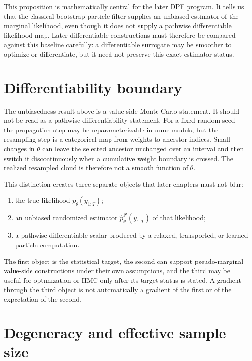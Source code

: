 This proposition is mathematically central for the later DPF program.  It tells
us that the classical bootstrap particle filter supplies an unbiased estimator
of the marginal likelihood, even though it does not supply a pathwise differentiable
likelihood map.  Later differentiable constructions must therefore be compared
against this baseline carefully: a differentiable surrogate may be smoother to
optimize or differentiate, but it need not preserve this exact estimator
status.

\section{Differentiability boundary}
\label{sec:bf-pf-differentiability-boundary}

The unbiasedness result above is a value-side Monte Carlo statement.  It should
not be read as a pathwise differentiability statement.  For a fixed random seed,
the propagation step may be reparameterizable in some models, but the
resampling step is a categorical map from weights to ancestor indices.  Small
changes in $\theta$ can leave the selected ancestor unchanged over an interval
and then switch it discontinuously when a cumulative weight boundary is crossed.
The realized resampled cloud is therefore not a smooth function of $\theta$.

This distinction creates three separate objects that later chapters must not
blur:
\begin{enumerate}[label=(\roman*)]
  \item the true likelihood $p_\theta(y_{1:T})$;
  \item an unbiased randomized estimator
    $\hat p_\theta^N(y_{1:T})$ of that likelihood;
  \item a pathwise differentiable scalar produced by a relaxed, transported, or
    learned particle computation.
\end{enumerate}
The first object is the statistical target, the second can support
pseudo-marginal value-side constructions under their own assumptions, and the
third may be useful for optimization or HMC only after its target status is
stated.  A gradient through the third object is not automatically a gradient of
the first or of the expectation of the second.

\section{Degeneracy and effective sample size}
\label{sec:bf-pf-degeneracy}

